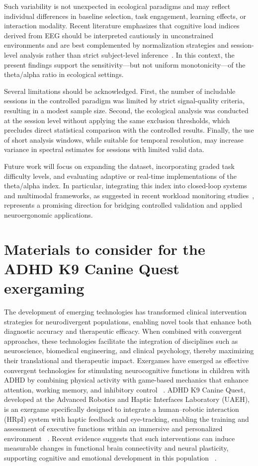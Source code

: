\documentclass[letterpaper, 10 pt, conference]{ieeeconf}
\begin{document}
Such variability is not unexpected in ecological paradigms and may reflect individual differences in baseline selection, task engagement, learning effects, or interaction modality. Recent literature emphasizes that cognitive load indices derived from EEG should be interpreted cautiously in unconstrained environments and are best complemented by normalization strategies and session-level analysis rather than strict subject-level inference~\cite{c1,c6}. In this context, the present findings support the sensitivity—but not uniform monotonicity—of the theta/alpha ratio in ecological settings.

Several limitations should be acknowledged. First, the number of includable sessions in the controlled paradigm was limited by strict signal-quality criteria, resulting in a modest sample size. Second, the ecological analysis was conducted at the session level without applying the same exclusion thresholds, which precludes direct statistical comparison with the controlled results. Finally, the use of short analysis windows, while suitable for temporal resolution, may increase variance in spectral estimates for sessions with limited valid data.

Future work will focus on expanding the dataset, incorporating graded task difficulty levels, and evaluating adaptive or real-time implementations of the theta/alpha index. In particular, integrating this index into closed-loop systems and multimodal frameworks, as suggested in recent workload monitoring studies~\cite{c10}, represents a promising direction for bridging controlled validation and applied neuroergonomic applications.

\section{Materials to consider for the ADHD K9 Canine Quest exergaming}
%
The development of emerging technologies has transformed clinical intervention strategies for neurodivergent populations, enabling novel tools that enhance both diagnostic accuracy and therapeutic efficacy. When combined with convergent approaches, these technologies facilitate the integration of disciplines such as neuroscience, biomedical engineering, and clinical psychology, thereby maximizing their translational and therapeutic impact. Exergames have emerged as effective convergent technologies for stimulating neurocognitive functions in children with ADHD by combining physical activity with game-based mechanics that enhance attention, working memory, and inhibitory control ~\cite{14, 15}. ADHD K9 Canine Quest, developed at the Advanced Robotics and Haptic Interfaces Laboratory (UAEH), is an exergame specifically designed to integrate a human–robotic interaction (HRpI) system with haptic feedback and eye-tracking, enabling the training and assessment of executive functions within an immersive and personalized environment ~\cite{16}. Recent evidence suggests that such interventions can induce measurable changes in functional brain connectivity and neural plasticity, supporting cognitive and emotional development in this population ~\cite{17}.
\end{document}
